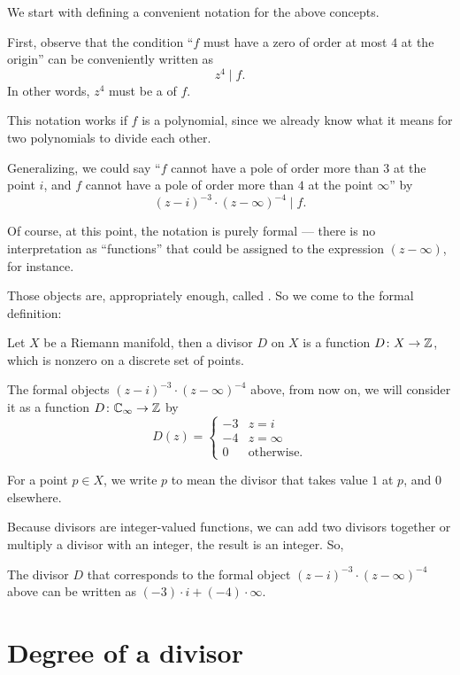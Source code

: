 We start with defining a convenient notation for the above concepts.

First, observe that the condition ``$f$ must have a zero of order at most $4$ at the origin'' can be
conveniently written as
\[ z^4 \mid f.  \]
In other words, $z^4$ must be a  of $f$.

This notation works if $f$ is a polynomial, since we already know what it means for two polynomials
to divide each other.

Generalizing, we could say ``$f$ cannot have a pole of order more than $3$ at the point $i$,
and $f$ cannot have a pole of order more than $4$ at the point $\infty$'' by
\[ (z-i)^{-3} \cdot (z-\infty)^{-4} \mid f.  \]

Of course, at this point, the notation is purely formal --- there is no interpretation as
``functions'' that could be assigned to the expression $(z-\infty)$, for instance.

Those objects are, appropriately enough, called . So we come to the formal
definition:
\begin{definition}[Divisors]
	Let $X$ be a Riemann manifold, then a divisor $D$ on $X$ is a function $D \colon X \to \mathbb Z$,
	which is nonzero on a discrete set of points.
\end{definition}

The formal objects $(z-i)^{-3} \cdot (z-\infty)^{-4}$ above, from now on, we will consider it as a
function $D \colon \mathbb C_\infty \to \mathbb Z$ by
\[ D(z) = \begin{cases} -3 & z = i \\ -4 & z = \infty \\ 0 & \text{otherwise}. \end{cases} \]

\begin{abuse}
	For a point $p \in X$, we write $p$ to mean the divisor that takes value $1$ at $p$, and $0$
	elsewhere.
\end{abuse}

Because divisors are integer-valued functions, we can add two divisors together or multiply a
divisor with an integer, the result is an integer. So,
\begin{example}
	The divisor $D$ that corresponds to the formal object $(z-i)^{-3} \cdot (z-\infty)^{-4}$ above
	can be written as $(-3) \cdot i + (-4) \cdot \infty$.
\end{example}

\section{Degree of a divisor}

